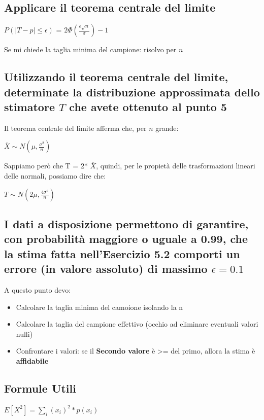 \documentclass{article}
\begin{document}
\subsection*{Applicare il teorema centrale del limite}

$P(|T - p| \leq \epsilon)$ = $2\Phi(\frac{\epsilon\sqrt{n}}{\sigma}) - 1$

Se mi chiede la taglia minima del campione: risolvo per $n$

\subsection*{Utilizzando il teorema centrale del limite, determinate la distribuzione approssimata dello stimatore $T$ che avete ottenuto al punto 5}

Il teorema centrale del limite afferma che, per $n$ grande:

$\overline{X} \sim N(\mu, \frac{\sigma^2}{n})$

Sappiamo però che T = 2* $\overline{X}$, quindi, per le propietà delle trasformazioni lineari delle normali, possiamo dire che:

$T \sim N (2 \mu, \frac{4 \sigma^2}{n})$

\subsection*{I dati a disposizione permettono di garantire, con probabilità maggiore o uguale a 0.99, che la stima fatta nell'Esercizio 5.2 comporti un errore (in valore assoluto) di massimo $\epsilon = 0.1$}

A questo punto devo:

\begin{itemize}
    \item Calcolare la taglia minima del camoione isolando la n
    \item Calcolare la taglia del campione effettivo (occhio ad eliminare eventuali valori nulli)
    \item Confrontare i valori: se il \textbf{Secondo valore} è >= del primo, allora la stima è \textbf{affidabile}
\end{itemize}


\subsection*{Formule Utili}

$E[X^2] = \sum_{i}(x_i)^2*p(x_i)$

\pagebreak
\end{document}
